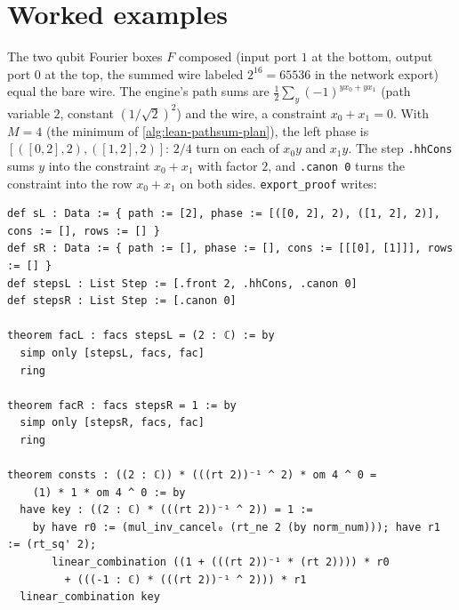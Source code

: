 \section{Worked examples}\label{sec:lean-pathsum-examples}

\begin{example}\label{ex:lean-pathsum-hh}
\begin{center}
\end{center}
The two qubit Fourier boxes $F$ composed (input port $1$ at the bottom, output port $0$ at the top,
the summed wire labeled $2^{16} = 65536$ in the network export) equal the bare wire. The engine's
path sums are $\frac12\sum_{y}(-1)^{y x_0 + y x_1}$ (path variable $2$, constant $(1/\sqrt2)^2$) and
the wire, a constraint $x_0+x_1=0$. With $M=4$ (the minimum of \cref{alg:lean-pathsum-plan}), the
left phase is $[([0,2],2),([1,2],2)]$: $2/4$ turn on each of $x_0y$ and $x_1y$. The step
\textnormal{\texttt{.\allowbreak{}hhCons}} sums $y$ into the constraint $x_0+x_1$ with factor $2$, and \textnormal{\texttt{.\allowbreak{}canon 0}} turns
the constraint into the row $x_0+x_1$ on both sides. \textnormal{\texttt{export\_\allowbreak{}proof}} writes:
\begin{lstlisting}[style=lean]
def sL : Data := { path := [2], phase := [([0, 2], 2), ([1, 2], 2)], cons := [], rows := [] }
def sR : Data := { path := [], phase := [], cons := [[[0], [1]]], rows := [] }
def stepsL : List Step := [.front 2, .hhCons, .canon 0]
def stepsR : List Step := [.canon 0]

theorem facL : facs stepsL = (2 : ℂ) := by
  simp only [stepsL, facs, fac]
  ring

theorem facR : facs stepsR = 1 := by
  simp only [stepsR, facs, fac]
  ring

theorem consts : ((2 : ℂ)) * (((rt 2))⁻¹ ^ 2) * om 4 ^ 0 =
    (1) * 1 * om 4 ^ 0 := by
  have key : ((2 : ℂ) * (((rt 2))⁻¹ ^ 2)) = 1 :=
    by have r0 := (mul_inv_cancel₀ (rt_ne 2 (by norm_num))); have r1 := (rt_sq' 2);
       linear_combination ((1 + (((rt 2))⁻¹ * (rt 2)))) * r0
         + (((-1 : ℂ) * (((rt 2))⁻¹ ^ 2))) * r1
  linear_combination key


\end{lstlisting}
\end{example}
